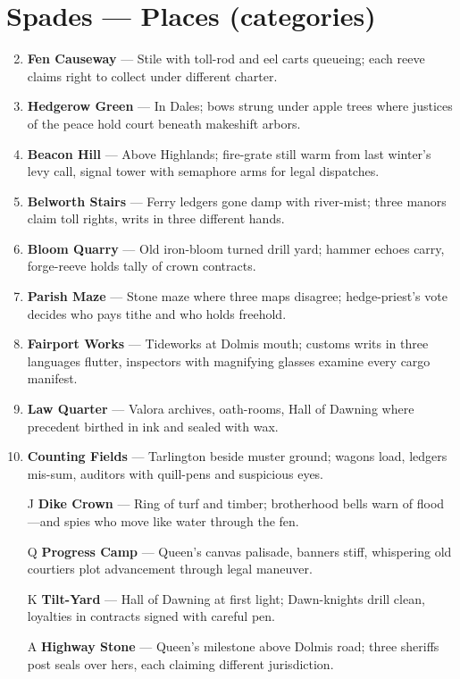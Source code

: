 \section*{Spades --- Places (categories)}
\label{sec:viterra-places}
\begin{enumerate}
\setcounter{enumi}{1}
\item \textbf{Fen Causeway} --- Stile with toll-rod and eel carts queueing; each reeve claims right to collect under different charter.
\item \textbf{Hedgerow Green} --- In Dales; bows strung under apple trees where justices of the peace hold court beneath makeshift arbors.
\item \textbf{Beacon Hill} --- Above Highlands; fire-grate still warm from last winter's levy call, signal tower with semaphore arms for legal dispatches.
\item \textbf{Belworth Stairs} --- Ferry ledgers gone damp with river-mist; three manors claim toll rights, writs in three different hands.
\item \textbf{Bloom Quarry} --- Old iron-bloom turned drill yard; hammer echoes carry, forge-reeve holds tally of crown contracts.
\item \textbf{Parish Maze} --- Stone maze where three maps disagree; hedge-priest's vote decides who pays tithe and who holds freehold.
\item \textbf{Fairport Works} --- Tideworks at Dolmis mouth; customs writs in three languages flutter, inspectors with magnifying glasses examine every cargo manifest.
\item \textbf{Law Quarter} --- Valora archives, oath-rooms, Hall of Dawning where precedent birthed in ink and sealed with wax.
\item \textbf{Counting Fields} --- Tarlington beside muster ground; wagons load, ledgers mis-sum, auditors with quill-pens and suspicious eyes.
\item[J] \textbf{Dike Crown} --- Ring of turf and timber; brotherhood bells warn of flood—and spies who move like water through the fen.
\item[Q] \textbf{Progress Camp} --- Queen's canvas palisade, banners stiff, whispering old courtiers plot advancement through legal maneuver.
\item[K] \textbf{Tilt-Yard} --- Hall of Dawning at first light; Dawn-knights drill clean, loyalties in contracts signed with careful pen.
\item[A] \textbf{Highway Stone} --- Queen's milestone above Dolmis road; three sheriffs post seals over hers, each claiming different jurisdiction.
\end{enumerate}

